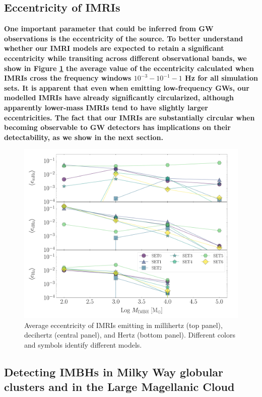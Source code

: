 \documentclass[article]{aa}
\begin{document}
\subsection{Eccentricity of IMRIs}
{\bf
One important parameter that could be inferred from GW observations is the eccentricity of the source. To better understand whether our IMRI models are expected to retain a significant eccentricity while transiting across different observational bands, we show in Figure \ref{fig:f10} the average value of the eccentricity calculated when IMRIs cross the frequency windows $10^{-3}-10^{-1}-1$ Hz for all simulation sets. It is apparent that even when emitting low-frequency GWs, our modelled IMRIs have already significantly circularized, although apparently lower-mass IMRIs tend to have slightly larger eccentricities. The fact that our IMRIs are substantially circular when becoming observable to GW detectors has implications on their detectability, as we show in the next section.
}

\begin{figure}
\centering
\includegraphics[width=\columnwidth]{averageec}
\caption{Average eccentricity of IMRIs emitting in millihertz (top panel), decihertz (central panel), and Hertz (bottom panel). Different colors and symbols identify different models. }
\label{fig:f10}
\end{figure}



\subsection{Detecting IMBHs in Milky Way globular clusters and in the Large Magellanic Cloud}
\end{document}
